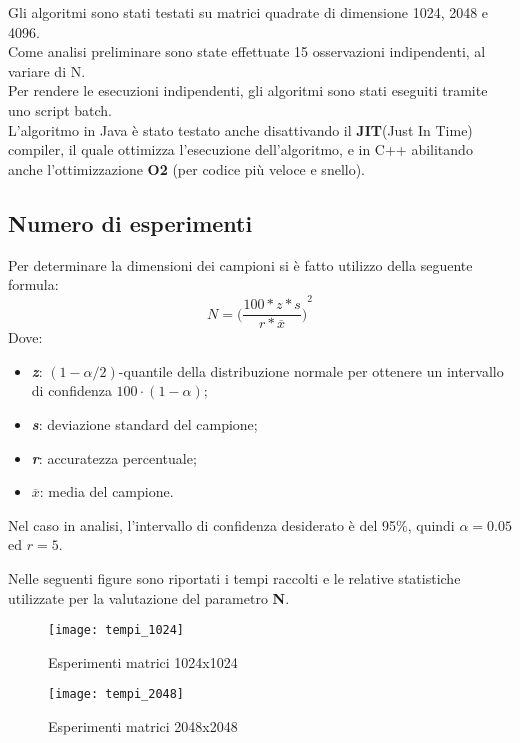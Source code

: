 Gli algoritmi sono stati testati su matrici quadrate di dimensione 1024, 2048 e 4096.\\
Come analisi preliminare sono state effettuate 15 osservazioni indipendenti, al variare di N.\\
Per rendere le esecuzioni indipendenti, gli algoritmi sono stati eseguiti tramite uno
script batch.\\
L'algoritmo in Java è stato testato anche disattivando il \textbf{JIT}(Just In Time)
compiler, il quale ottimizza l'esecuzione dell'algoritmo, e in C++ abilitando anche
l'ottimizzazione \textbf{O2} (per codice più veloce e snello).\\

\subsection{Numero di esperimenti}

Per determinare la dimensioni dei campioni si è fatto utilizzo della seguente formula:
$$N= {\biggl({{\frac{100*z*s}{r*\overline{x}}}\biggr)}^2}$$
Dove:
\begin{itemize}
  \item \textbf{\textit{z}}: $(1-{\alpha / 2})$-quantile della distribuzione normale
  per ottenere un intervallo di confidenza $100\cdot(1-\alpha)$;
  \item \textbf{\textit{s}}: deviazione standard del campione;
  \item \textbf{\textit{r}}: accuratezza percentuale;
  \item \textbf{{$\overline{\textit{x}}$}}: media del campione.
\end{itemize}

Nel caso in analisi, l'intervallo di confidenza desiderato è del 95\%, quindi
$\alpha = 0.05$ ed $ r = 5 $.

Nelle seguenti figure sono riportati i tempi raccolti e le relative statistiche
utilizzate per la valutazione del parametro \textbf{N}.
\begin{figure}[!htbp]
  \texttt{[image: tempi\_1024]}
  \caption{Esperimenti matrici 1024x1024}
  \label{tempi_1024}
\end{figure}

\begin{figure}[!htbp]
  \texttt{[image: tempi\_2048]}
  \caption{Esperimenti matrici 2048x2048}
  \label{tempi_2048}
\end{figure}

